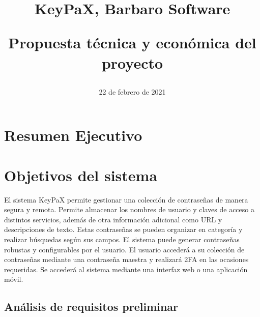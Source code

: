 \documentclass{article}
\title{
\Huge{KeyPaX, Barbaro Software} \\
\begin{Large}
Propuesta técnica y económica    del proyecto
\end{Large}}
\date{22 de febrero de 2021}
\begin{document}
\maketitle

\pagebreak

\tableofcontents

\pagebreak

\section{Resumen Ejecutivo}


\pagebreak

\section{Objetivos del sistema}


El sistema KeyPaX permite gestionar una colección de contraseñas de manera segura y remota. Permite almacenar los nombres de usuario y claves de acceso a distintos servicios, además de otra información adicional como URL y descripciones de texto. Estas contraseñas se pueden organizar en categoría y realizar búsquedas según sus campos. El sistema puede generar contraseñas robustas y configurables por el usuario. El usuario accederá a su colección de contraseñas mediante una contraseña maestra y realizará 2FA en las ocasiones requeridas. Se accederá al sistema mediante una interfaz web o una aplicación móvil.

\subsection{Análisis de requisitos preliminar}


\end{document}
